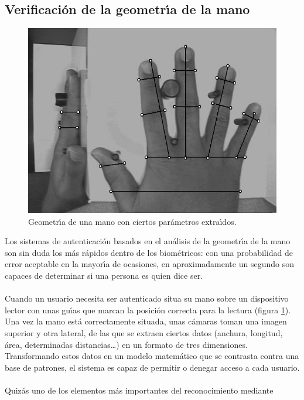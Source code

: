 \subsection{Verificaci\'on de la geometr\'{\i}a de la mano}
\begin{figure}[t]
\begin{center}
\includegraphics[width=\textwidth]{hand.png}
\end{center}
\caption{Geometr\'{\i}a de una mano con ciertos par\'ametros extra\'{\i}dos.}
\label{hand}
\end{figure}
Los sistemas de autenticaci\'on basados en el an\'alisis de la geometr\'{\i}a
de la mano son sin duda los m\'as r\'apidos dentro de los biom\'etricos: con
una probabilidad de error aceptable en la mayor\'{\i}a de ocasiones, en 
aproximadamente un 
segundo son capaces de determinar si una persona es quien dice ser.\\
\\Cuando un usuario necesita ser autenticado situa su mano sobre un dispositivo
lector con unas gu\'{\i}as que marcan la posici\'on correcta para la lectura
(figura \ref{hand}). Una vez la mano est\'a correctamente situada, unas 
c\'amaras toman una imagen superior y otra lateral, de las que se extraen 
ciertos datos (anchura, longitud, \'area, determinadas distancias\ldots) en un 
formato de tres dimensiones. Transformando estos datos en un modelo 
matem\'atico que se contrasta contra una base de patrones, el sistema es capaz
de permitir o denegar acceso a cada usuario.\\
\\Quiz\'as uno de los elementos m\'as importantes del reconocimiento mediante
